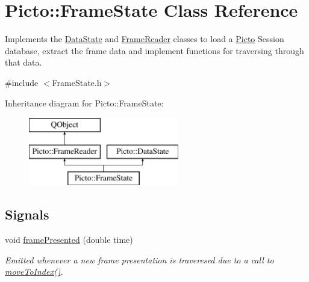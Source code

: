 \hypertarget{class_picto_1_1_frame_state}{\section{Picto\-:\-:Frame\-State Class Reference}
\label{class_picto_1_1_frame_state}
}


Implements the \hyperlink{class_picto_1_1_data_state}{Data\-State} and \hyperlink{class_picto_1_1_frame_reader}{Frame\-Reader} classes to load a \hyperlink{namespace_picto}{Picto} Session database, extract the frame data and implement functions for traversing through that data.  




{\ttfamily \#include $<$Frame\-State.\-h$>$}

Inheritance diagram for Picto\-:\-:Frame\-State\-:\begin{figure}[H]
\begin{center}
\leavevmode
\includegraphics[height=3.000000cm]{class_picto_1_1_frame_state}
\end{center}
\end{figure}
\subsection*{Signals}
\begin{DoxyCompactItemize}
\item 
void \hyperlink{class_picto_1_1_frame_state_abaadb881681c0f11bae06935672e04b1}{frame\-Presented} (double time)
\begin{DoxyCompactList}\small\item\em Emitted whenever a new frame presentation is traveresed due to a call to \hyperlink{class_picto_1_1_frame_state_af81303f5e09d827fbcf1db0c2485ffef}{move\-To\-Index()}. \end{DoxyCompactList}\end{DoxyCompactItemize}
